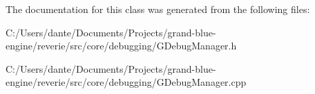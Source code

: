 The documentation for this class was generated from the following files\+:\begin{DoxyCompactItemize}
\item 
C\+:/\+Users/dante/\+Documents/\+Projects/grand-\/blue-\/engine/reverie/src/core/debugging/G\+Debug\+Manager.\+h\item 
C\+:/\+Users/dante/\+Documents/\+Projects/grand-\/blue-\/engine/reverie/src/core/debugging/G\+Debug\+Manager.\+cpp\end{DoxyCompactItemize}
